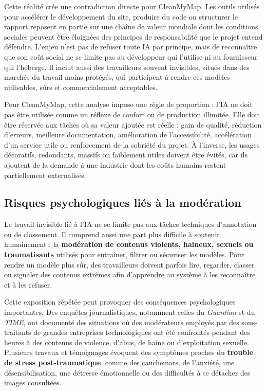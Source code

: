 \documentclass[
  10pt,
  a4paper,
  DIV=11,
  numbers=noendperiod,
  oneside]{scrreprt}
\let\oldtextbf\textbf
\renewcommand{\textbf}[1]{\oldtextbf{\textcolor{cmmnavy}{#1}}}
\let\oldemph\emph
\renewcommand{\emph}[1]{\oldemph{\textcolor{cmmgray}{#1}}}
\begin{document}
Cette réalité crée une contradiction directe pour CleanMyMap. Les outils
utilisés pour accélérer le développement du site, produire du code ou
structurer le rapport reposent en partie sur une chaîne de valeur
mondiale dont les conditions sociales peuvent être éloignées des
principes de responsabilité que le projet entend défendre. L'enjeu n'est
pas de refuser toute IA par principe, mais de reconnaître que son coût
social ne se limite pas au développeur qui l'utilise ni au fournisseur
qui l'héberge. Il inclut aussi des travailleurs souvent invisibles,
situés dans des marchés du travail moins protégés, qui participent à
rendre ces modèles utilisables, sûrs et commercialement acceptables.

Pour CleanMyMap, cette analyse impose une règle de proportion : l'IA ne
doit pas être utilisée comme un réflexe de confort ou de production
illimitée. Elle doit être réservée aux tâches où sa valeur ajoutée est
réelle : gain de qualité, réduction d'erreurs, meilleure documentation,
amélioration de l'accessibilité, accélération d'un service utile ou
renforcement de la sobriété du projet. À l'inverse, les usages
décoratifs, redondants, massifs ou faiblement utiles doivent être
évités, car ils ajoutent de la demande à une industrie dont les coûts
humains restent partiellement externalisés.

\subsection{Risques psychologiques liés à la
modération}\label{risques-psychologiques-liuxe9s-uxe0-la-moduxe9ration}

Le travail invisible lié à l'IA ne se limite pas aux tâches techniques
d'annotation ou de classement. Il comprend aussi une part plus difficile
à soutenir humainement : la \textbf{modération de contenus violents,
haineux, sexuels ou traumatisants} utilisés pour entraîner, filtrer ou
sécuriser les modèles. Pour rendre un modèle plus sûr, des travailleurs
doivent parfois lire, regarder, classer ou signaler des contenus
extrêmes afin d'apprendre au système à les reconnaître et à les refuser.

Cette exposition répétée peut provoquer des conséquences psychologiques
importantes. Des enquêtes journalistiques, notamment celles du
\emph{Guardian} et du \emph{TIME}, ont documenté des situations où des
modérateurs employés par des sous-traitants de grandes entreprises
technologiques ont été confrontés pendant des heures à des contenus de
violence, d'abus, de haine ou d'exploitation sexuelle. Plusieurs travaux
et témoignages évoquent des symptômes proches du \textbf{trouble de
stress post-traumatique}, comme des cauchemars, de l'anxiété, une
désensibilisation, une détresse émotionnelle ou des difficultés à se
détacher des images consultées.
\end{document}
